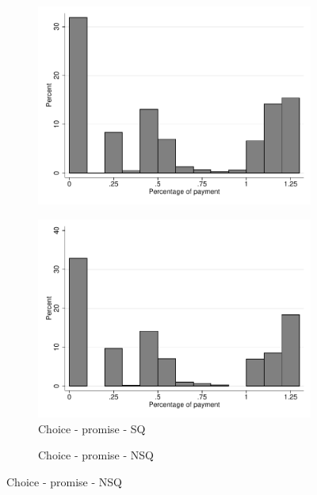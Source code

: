 \documentclass[11pt]{article}
\begin{document}
\begin{figure}[H]
\begin{center}
\begin{subfigure}{.31\textwidth}
        \includegraphics[width=\textwidth]{Figuras/hist_porc_pay_pro_5.pdf}
    \end{subfigure}  
     \begin{subfigure}{.31\textwidth}
    \caption{Choice - promise - SQ}
        \centering
        \includegraphics[width=\textwidth]{Figuras/hist_porc_pay_pro_8.pdf}
    \end{subfigure}    
     \begin{subfigure}{.31\textwidth}
    \caption{Choice - promise - NSQ}
        \centering

\end{subfigure}
\end{center}
\end{figure}
\end{document}

